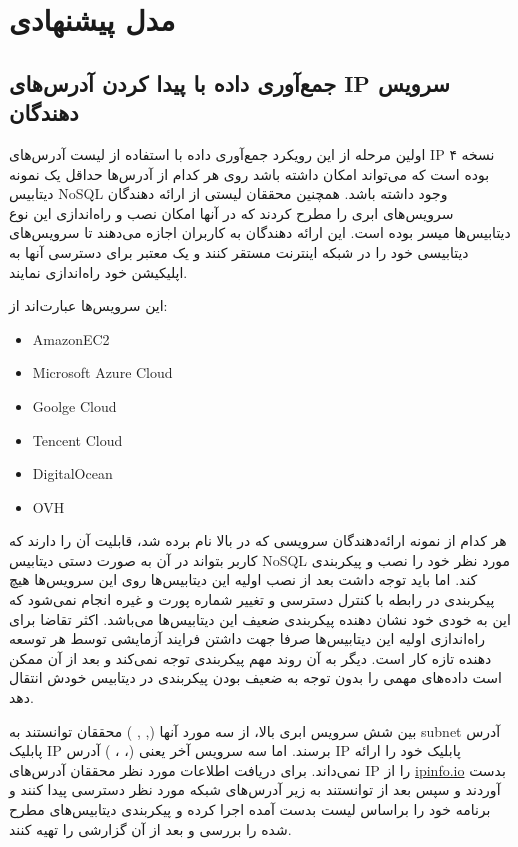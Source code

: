 \documentclass[10pt, a4paper]{article}
\begin{document}
\section{مدل پیشنهادی}

\subsection{جمع‌آوری داده با پیدا کردن آدرس‌های IP سرویس دهندگان}

اولین مرحله از این رویکرد جمع‌آوری داده با استفاده از لیست آدرس‌های IP نسخه ۴
بوده است که می‌تواند امکان داشته باشد روی هر کدام از آدرس‌ها حداقل یک نمونه
دیتابیس NoSQL وجود داشته باشد. همچنین محققان لیستی از ارائه دهندگان سرویس‌های
ابری را مطرح کردند که در آنها امکان نصب و راه‌اندازی این نوع دیتابیس‌ها میسر
بوده است. این ارائه دهندگان به کاربران اجازه می‌دهند تا سرویس‌های دیتابیسی خود
را در شبکه اینترنت مستقر کنند و یک  معتبر برای دسترسی آنها
به اپلیکیشن‌ خود راه‌اندازی نمایند.

این سرویس‌ها عبارت‌اند از:

\begin{LTR}
    \begin{itemize}
        \item AmazonEC2
        \item Microsoft Azure Cloud
        \item Goolge Cloud
        \item Tencent Cloud
        \item DigitalOcean
        \item OVH
    \end{itemize}
\end{LTR}

هر کدام از نمونه ارائه‌دهندگان سرویسی که در بالا نام برده شد، قابلیت آن را دارند
که کاربر بتواند در آن به صورت دستی دیتابیس NoSQL مورد نظر خود را نصب و پیکربندی
کند. اما باید توجه داشت بعد از نصب اولیه این دیتابیس‌ها روی این سرویس‌ها هیچ
پیکربندی در رابطه با کنترل دسترسی و تغییر شماره پورت و غیره انجام نمی‌شود که این
به خودی خود نشان دهنده پیکربندی ضعیف این دیتابیس‌ها می‌باشد. اکثر تقاضا برای
راه‌اندازی اولیه این دیتابیس‌ها صرفا جهت داشتن فرایند آزمایشی توسط هر توسعه
دهنده تازه کار است. دیگر به آن روند مهم پیکربندی توجه نمی‌کند و بعد از آن ممکن
است داده‌های مهمی را بدون توجه به ضعیف بودن پیکربندی در دیتابیس خودش انتقال دهد.

بین شش  سرویس ابری بالا، از سه مورد آنها (, , ) محققان توانستند به subnet آدرس پابلیک IP برسند.  اما
سه سرویس آخر یعنی (، ، ) آدرس IP
پابلیک خود را ارائه نمی‌داند.  برای دریافت اطلاعات مورد نظر محققان آدرس‌های IP
را از \href{https://ipinfo.io}{ipinfo.io} بدست آوردند و سپس بعد از توانستند به
زیر آدرس‌های شبکه مورد نظر دسترسی پیدا کنند و برنامه خود را براساس لیست بدست
آمده اجرا کرده و پیکربندی دیتابیس‌های مطرح شده را بررسی و بعد از آن گزارشی را
تهیه کنند.
\end{document}
